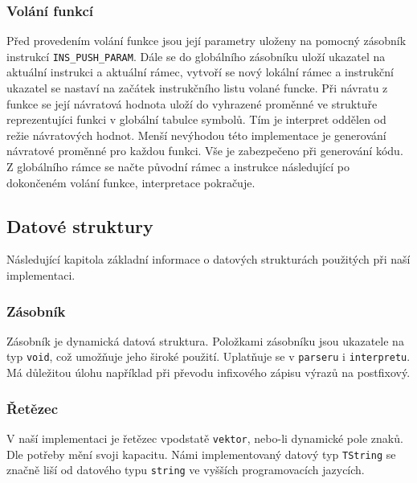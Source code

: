 \documentclass[a4paper, 12pt]{article}
\begin{document}
\subsubsection{Volání funkcí}
Před provedením volání funkce jsou její parametry uloženy na pomocný zásobník
instrukcí \texttt{INS\_PUSH\_PARAM}. Dále se do globálního zásobníku uloží
ukazatel na aktuální instrukci a aktuální rámec, vytvoří se nový lokální rámec
a instrukční ukazatel se nastaví na začátek instrukčního listu volané funcke.
Při návratu z funkce se její návratová hodnota uloží do vyhrazené
proměnné ve struktuře reprezentujíci funkci v globální tabulce symbolů.
Tím je interpret oddělen od režie návratových hodnot. Menší nevýhodou této
implementace je generování návratové proměnné pro každou funkci.
Vše je zabezpečeno při generování kódu. Z globálního rámce se načte původní
rámec a instrukce následující po dokončeném volání funkce, interpretace pokračuje.

\newpage

\subsection{Datové struktury}

Následující kapitola základní informace o datových strukturách použitých při
naší implementaci.

\subsubsection{Zásobník}
Zásobník je dynamická datová struktura. Položkami zásobníku jsou ukazatele
na typ \texttt{void}, což umožňuje jeho široké použití.
Uplatňuje se v \texttt{parseru} i \texttt{interpretu}. Má důležitou úlohu
například při převodu infixového zápisu výrazů na postfixový.

\subsubsection{Řetězec}
V naší implementaci je řetězec vpodstatě \texttt{vektor}, nebo-li dynamické pole znaků.
Dle potřeby mění svoji kapacitu. Námi implementovaný datový typ \texttt{TString}
se značně liší od datového typu \texttt{string} ve vyšších programovacích
jazycích.
\end{document}
